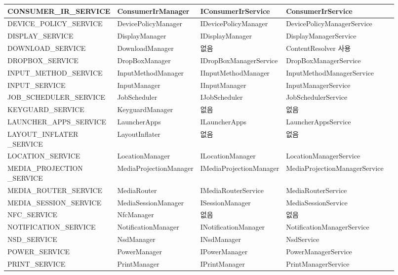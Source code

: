 {\begin{tabular}[fontsize=\tiny]{|l|l|l|l|l|}
CONSUMER\_IR\_SERVICE & ConsumerIrManager & IConsumerIrService & ConsumerIrService \\ \hline
DEVICE\_POLICY\_SERVICE & DevicePolicyManager & IDevicePolicyManager & DevicePolicyManagerService \\ \hline
DISPLAY\_SERVICE	& DisplayManager & IDisplayManager & DisplayManagerService \\ \hline
DOWNLOAD\_SERVICE & DownloadManager & 없음 & ContentResolver 사용 \\ \hline
DROPBOX\_SERVICE	& DropBoxManager & IDropBoxManagerService &  DropBoxManagerService\\ \hline
INPUT\_METHOD\_SERVICE	 & InputMethodManager & IInputMethodManager & InputMethodManagerService \\ \hline
INPUT\_SERVICE & InputManager & IInputManager & InputManagerService \\ \hline
JOB\_SCHEDULER\_SERVICE & JobScheduler & IJobScheduler & JobSchedulerService \\ \hline
KEYGUARD\_SERVICE	 & KeyguardManager & 없음 & 없음 \\ \hline
LAUNCHER\_APPS\_SERVICE & LauncherApps &  ILauncherApps & LauncherAppsService \\ \hline
\makecell[l]{LAYOUT\_INFLATER\\ \_SERVICE} & LayoutInflater & 없음 & 없음 \\ \hline
LOCATION\_SERVICE	 & LocationManager & ILocationManager & LocationManagerService \\ \hline
\makecell[l]{MEDIA\_PROJECTION\\ \_SERVICE}	 & MediaProjectionManager  & IMediaProjectionManager & MediaProjectionManagerService \\ \hline
MEDIA\_ROUTER\_SERVICE	 & MediaRouter & IMediaRouterService & MediaRouterService \\ \hline
MEDIA\_SESSION\_SERVICE & MediaSessionManager & ISessionManager & MediaSessionService\\ \hline
NFC\_SERVICE	& NfcManager & 없음 & 없음 \\ \hline
NOTIFICATION\_SERVICE & NotificationManager & INotificationManager & NotificationManagerService \\ \hline
NSD\_SERVICE	& NsdManager & INsdManager & NsdService \\ \hline
POWER\_SERVICE & PowerManager & IPowerManager & PowerManagerService \\ \hline
PRINT\_SERVICE &	PrintManager & IPrintManager & PrintManagerService\\ \hline

\end{tabular}}
